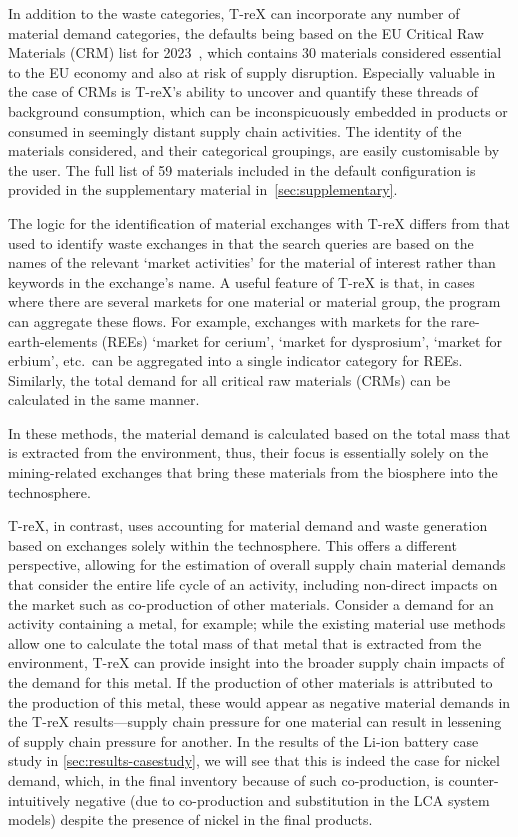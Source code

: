 In addition to the waste categories, T-reX can incorporate any number of material demand categories, the defaults being based on the EU Critical Raw Materials (CRM) list for 2023~\citep{eu2023crmstudy}, which contains 30 materials considered essential to the EU economy and also at risk of supply disruption. Especially valuable in the case of CRMs is T-reX's ability to uncover and quantify these threads of background consumption, which can be inconspicuously embedded in products or consumed in seemingly distant supply chain activities. The identity of the materials considered, and their categorical groupings, are easily customisable by the user. The full list of 59 materials included in the default configuration is provided in the supplementary material in~\autoref{sec:supplementary}.

The logic for the identification of material exchanges with T-reX differs from that used to identify waste exchanges in that the search queries are based on the names of the relevant `market activities' for the material of interest rather than keywords in the exchange's name. A useful feature of T-reX is that, in cases where there are several markets for one material or material group, the program can aggregate these flows. For example, exchanges with markets for the rare-earth-elements (REEs) `market for cerium', `market for dysprosium', `market for erbium', etc.\ can be aggregated into a single indicator category for REEs. Similarly, the total demand for all critical raw materials (CRMs) can be calculated in the same manner.

In these methods, the material demand is calculated based on the total mass that is extracted from the environment, thus, their focus is essentially solely on the mining-related exchanges that bring these materials from the biosphere into the technosphere.

T-reX, in contrast, uses accounting for material demand and waste generation based on exchanges solely within the technosphere. This offers a different perspective, allowing for the estimation of overall supply chain material demands that consider the entire life cycle of an activity, including non-direct impacts on the market such as co-production of other materials. Consider a demand for an activity containing a metal, for example; while the existing material use methods allow one to calculate the total mass of that metal that is extracted from the environment, T-reX can provide insight into the broader supply chain impacts of the demand for this metal. If the production of other materials is attributed to the production of this metal, these would appear as negative material demands in the T-reX results---supply chain pressure for one material can result in lessening of supply chain pressure for another. In the results of the Li-ion battery case study in \autoref{sec:results-casestudy}, we will see that this is indeed the case for nickel demand, which, in the final inventory because of such co-production, is counter-intuitively negative (due to co-production and substitution in the LCA system models) despite the presence of nickel in the final products.


